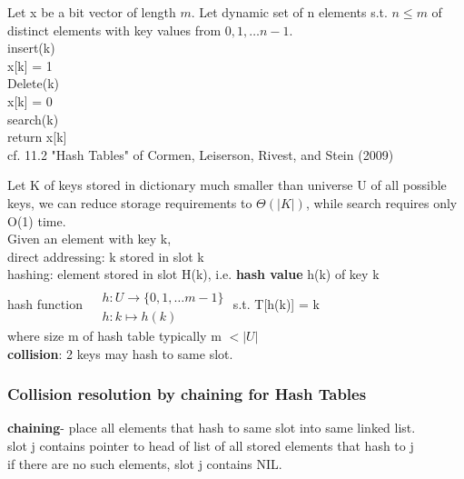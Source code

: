 \documentclass[10pt]{amsart}
\begin{document}
\begin{multicols*}{2}
Let x be a bit vector of length $m$. Let dynamic set of n elements s.t. $n\leq m$ of distinct elements with key values from $0, 1, \dots n-1$. \\

insert(k) \\
\quad x[k] = 1\\

Delete(k) \\
\quad x[k] = 0\\

search(k) \\
\quad return x[k] \\

cf. 11.2 "Hash Tables" of Cormen, Leiserson, Rivest, and Stein (2009) \cite{CLRS2009}

Let K of keys stored in dictionary much smaller than universe U of all possible keys, we can reduce storage requirements to $\Theta(|K|)$, while search requires only O(1) time. \\

Given an element with key k, \\
direct addressing: k stored in slot k \\
hashing: element stored in slot H(k), i.e. \textbf{hash value} h(k) of key k \\
hash function $\begin{aligned} & \quad \\ 
& h : U \to \lbrace 0, 1, \dots m -1 \rbrace \\
& h:k \mapsto h(k) \end{aligned}$ s.t. T[h(k)] = k \\

where size m of hash table typically m $< |U|$ \\

\textbf{collision}: 2 keys may hash to same slot. 

\subsubsection{Collision resolution by chaining for Hash Tables}

\textbf{chaining}- place all elements that hash to same slot into same linked list. \\
slot j contains pointer to head of list of all stored elements that hash to j \\
if there are no such elements, slot j contains NIL. \\


\end{multicols*}
\end{document}

